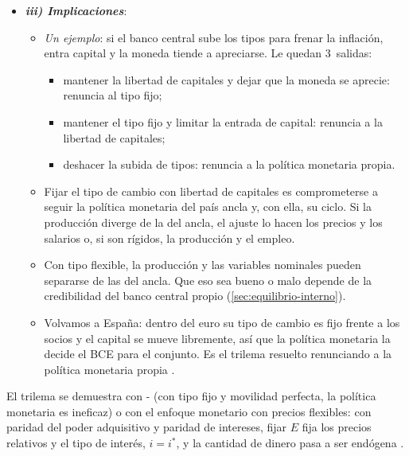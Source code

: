 \documentclass[11pt]{article}
\begin{document}
\begin{infografia}[H]
\centering
\caption{El trilema de la economía abierta}\label{figu:trilema}
\end{infografia}

\begin{itemize}
\item \textbf{\emph{iii) Implicaciones}}:
  \begin{itemize}
  \item \emph{Un ejemplo}: si el banco central sube los tipos para frenar la inflación, entra capital y la moneda tiende a apreciarse. Le quedan 3~salidas:
    \begin{itemize}
    \item mantener la libertad de capitales y dejar que la moneda se aprecie: renuncia al tipo fijo;
    \item mantener el tipo fijo y limitar la entrada de capital: renuncia a la libertad de capitales;
    \item deshacer la subida de tipos: renuncia a la política monetaria propia.
    \end{itemize}
  \item Fijar el tipo de cambio con libertad de capitales es comprometerse a seguir la política monetaria del país ancla y, con ella, su ciclo. Si la producción diverge de la del ancla, el ajuste lo hacen los precios y los salarios o, si son rígidos, la producción y el empleo.
  \item Con tipo flexible, la producción y las variables nominales pueden separarse de las del ancla. Que eso sea bueno o malo depende de la credibilidad del banco central propio (\ref{sec:equilibrio-interno}).
  \item Volvamos a España: dentro del euro su tipo de cambio es fijo frente a los socios y el capital se mueve libremente, así que la política monetaria la decide el BCE para el conjunto. Es el trilema resuelto renunciando a la política monetaria propia .
  \end{itemize}
\end{itemize}

\begin{notaopositor}
El trilema se demuestra con - (con tipo fijo y movilidad perfecta, la política monetaria es ineficaz)  o con el enfoque monetario con precios flexibles: con paridad del poder adquisitivo y paridad de intereses, fijar $E$ fija los precios relativos y el tipo de interés, $i=i^*$, y la cantidad de dinero pasa a ser endógena .
\end{notaopositor}
\end{document}
